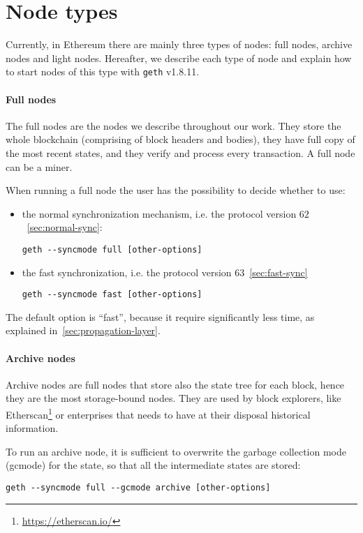 \section{Node types}
\label{sec:node-types}
Currently, in Ethereum there are mainly three types of nodes: full nodes,
archive nodes and light nodes. Hereafter, we describe each type of node and
explain how to start nodes of this type with \texttt{geth} v1.8.11.

\paragraph{Full nodes}
The full nodes are the nodes we describe throughout our work. They store the
whole blockchain (comprising of block headers and bodies), they have full copy
of the most recent states, and they verify and process every transaction. A full
node can be a miner.

When running a full node the user has the possibility to decide whether to use:
\begin{itemize}
    \item the normal synchronization mechanism, i.e. the protocol version
    $62$~\autoref{sec:normal-sync}:
    \begin{center}
        \verb|geth --syncmode full [other-options]|
    \end{center}
    \item the fast synchronization, i.e. the protocol version
    $63$~\autoref{sec:fast-sync}
    \begin{center}
        \verb|geth --syncmode fast [other-options]|
    \end{center}
\end{itemize}
The default option is ``fast'', because it require significantly less time, as
explained in~\autoref{sec:propagation-layer}.

\paragraph{Archive nodes}
Archive nodes are full nodes that store also the state tree for each block,
hence they are the most storage-bound nodes. They are used by block explorers,
like Etherscan\footnote{\url{https://etherscan.io/}} or enterprises that needs
to have at their disposal historical information.

To run an archive node, it is sufficient to overwrite the garbage collection
mode (gcmode) for the state, so that all the intermediate states are stored:
\begin{center}
\verb|geth --syncmode full --gcmode archive [other-options]|
\end{center}


